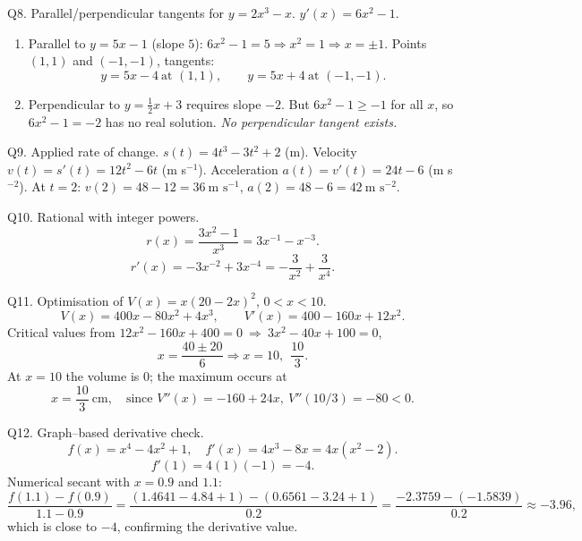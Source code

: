 \documentclass[11pt]{article}
\def\textbf#1{#1}%
\begin{document}
\begin{solution}
\textbf{Q8. Parallel/perpendicular tangents for $y=2x^{3}-x$.}
$y'(x)=6x^{2}-1$.
\begin{enumerate}
  \item Parallel to $y=5x-1$ (slope $5$): $6x^{2}-1=5\Rightarrow x^{2}=1\Rightarrow x=\pm1$.  
  Points $(1,1)$ and $(-1,-1)$, tangents:
  \[
  \boxed{y=5x-4}\ \text{at }(1,1),\qquad \boxed{y=5x+4}\ \text{at }(-1,-1).
  \]
  \item Perpendicular to $y=\tfrac12x+3$ requires slope $-2$.  
  But $6x^{2}-1\ge -1$ for all $x$, so $6x^{2}-1=-2$ has no real solution.  
  \emph{No perpendicular tangent exists.}
\end{enumerate}
\end{solution}

\begin{solution}
\textbf{Q9. Applied rate of change.}
$s(t)=4t^{3}-3t^{2}+2$ (m).  
Velocity $v(t)=s'(t)=\boxed{12t^{2}-6t}$ (m s$^{-1}$).  
Acceleration $a(t)=v'(t)=\boxed{24t-6}$ (m s$^{-2}$).  
At $t=2$: $v(2)=48-12=\boxed{36\ \text{m s}^{-1}}$, $a(2)=48-6=\boxed{42\ \text{m s}^{-2}}$.
\end{solution}

\begin{solution}
\textbf{Q10. Rational with integer powers.}
\[
r(x)=\frac{3x^{2}-1}{x^{3}}=3x^{-1}-x^{-3}.
\]
\[
r'(x)=\boxed{-3x^{-2}+3x^{-4}}=-\frac{3}{x^{2}}+\frac{3}{x^{4}}.
\]
\end{solution}

\begin{solution}
\textbf{Q11. Optimisation of $V(x)=x(20-2x)^{2}$, $0<x<10$.}
\[
V(x)=400x-80x^{2}+4x^{3},\qquad V'(x)=400-160x+12x^{2}.
\]
Critical values from $12x^{2}-160x+400=0\ \Rightarrow\ 3x^{2}-40x+100=0$,
\[
x=\frac{40\pm20}{6}\Rightarrow x=10,\ \ \frac{10}{3}.
\]
At $x=10$ the volume is $0$; the maximum occurs at
\[
\boxed{x=\frac{10}{3}\ \text{cm}},\quad \text{since }V''(x)=-160+24x,\ V''(10/3)=-80<0.
\]
\end{solution}

\begin{solution}
\textbf{Q12. Graph–based derivative check.}
\[
f(x)=x^{4}-4x^{2}+1,\quad f'(x)=4x^{3}-8x=4x(x^{2}-2).
\]
\[
f'(1)=4(1)(-1)=\boxed{-4}.
\]
Numerical secant with $x=0.9$ and $1.1$:
\[
\frac{f(1.1)-f(0.9)}{1.1-0.9}
=\frac{(1.4641-4.84+1)-(0.6561-3.24+1)}{0.2}
=\frac{-2.3759-(-1.5839)}{0.2}\approx \boxed{-3.96},
\]
which is close to $-4$, confirming the derivative value.
\end{solution}
\end{document}
